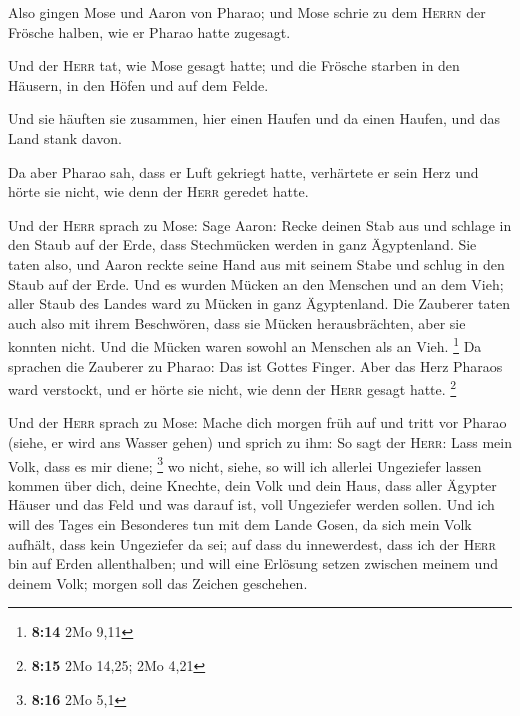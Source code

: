  Also gingen Mose und Aaron von Pharao; und Mose schrie zu
dem \textsc{Herrn} der Frösche halben, wie er Pharao hatte zugesagt.

 Und der \textsc{Herr} tat, wie Mose gesagt hatte; und die
Frösche starben in den Häusern, in den Höfen und auf dem Felde.

 Und sie häuften sie zusammen, hier einen Haufen und da
einen Haufen, und das Land stank davon.

 Da aber Pharao sah, dass er Luft gekriegt hatte,
verhärtete er sein Herz und hörte sie nicht, wie denn der \textsc{Herr}
geredet hatte.

 Und der \textsc{Herr} sprach zu Mose: Sage Aaron: Recke
deinen Stab aus und schlage in den Staub auf der Erde, dass Stechmücken
werden in ganz Ägyptenland.  Sie taten also, und Aaron
reckte seine Hand aus mit seinem Stabe und schlug in den Staub auf der
Erde. Und es wurden Mücken an den Menschen und an dem Vieh; aller Staub
des Landes ward zu Mücken in ganz Ägyptenland.  Die
Zauberer taten auch also mit ihrem Beschwören, dass sie Mücken
herausbrächten, aber sie konnten nicht. Und die Mücken waren sowohl an
Menschen als an Vieh. \footnote{\textbf{8:14} 2Mo 9,11} 
Da sprachen die Zauberer zu Pharao: Das ist Gottes Finger. Aber das Herz
Pharaos ward verstockt, und er hörte sie nicht, wie denn der
\textsc{Herr} gesagt hatte. \footnote{\textbf{8:15} 2Mo 14,25; 2Mo 4,21}

 Und der \textsc{Herr} sprach zu Mose: Mache dich morgen
früh auf und tritt vor Pharao (siehe, er wird ans Wasser gehen) und
sprich zu ihm: So sagt der \textsc{Herr}: Lass mein Volk, dass es mir
diene; \footnote{\textbf{8:16} 2Mo 5,1}  wo nicht, siehe,
so will ich allerlei Ungeziefer lassen kommen über dich, deine Knechte,
dein Volk und dein Haus, dass aller Ägypter Häuser und das Feld und was
darauf ist, voll Ungeziefer werden sollen.  Und ich will
des Tages ein Besonderes tun mit dem Lande Gosen, da sich mein Volk
aufhält, dass kein Ungeziefer da sei; auf dass du innewerdest, dass ich
der \textsc{Herr} bin auf Erden allenthalben;  und will
eine Erlösung setzen zwischen meinem und deinem Volk; morgen soll das
Zeichen geschehen.

